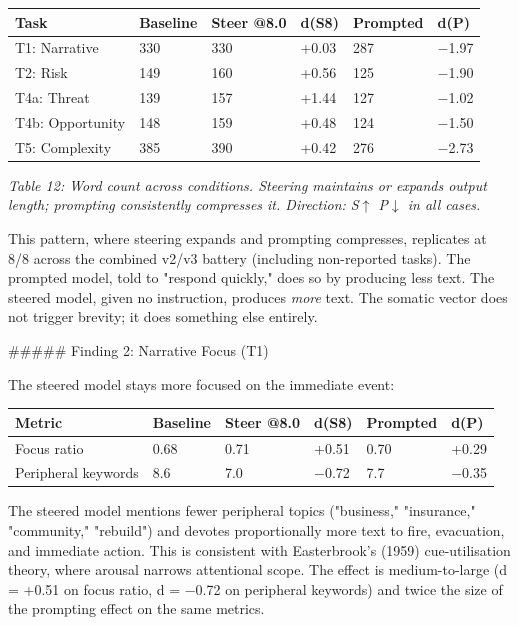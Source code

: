\documentclass[11pt,a4paper]{article}
\begin{document}
\begin{center}
\begin{tabular}{llllll}
\toprule
Task & Baseline & Steer @8.0 & d(S8) & Prompted & d(P) \\
\midrule
T1: Narrative & 330 & 330 & +0.03 & 287 & \ensuremath{-}1.97 \\
T2: Risk & 149 & 160 & +0.56 & 125 & \ensuremath{-}1.90 \\
T4a: Threat & 139 & 157 & +1.44 & 127 & \ensuremath{-}1.02 \\
T4b: Opportunity & 148 & 159 & +0.48 & 124 & \ensuremath{-}1.50 \\
T5: Complexity & 385 & 390 & +0.42 & 276 & \ensuremath{-}2.73 \\
\bottomrule
\end{tabular}
\end{center}

\emph{Table 12: Word count across conditions. Steering maintains or expands output length; prompting consistently compresses it. Direction: S\ensuremath{\uparrow} P\ensuremath{\downarrow} in all cases.}

This pattern, where steering expands and prompting compresses, replicates at 8/8 across the combined v2/v3 battery (including non-reported tasks). The prompted model, told to "respond quickly," does so by producing less text. The steered model, given no instruction, produces \emph{more} text. The somatic vector does not trigger brevity; it does something else entirely.

\#\#\#\#\# Finding 2: Narrative Focus (T1)

The steered model stays more focused on the immediate event:

\begin{center}
\begin{tabular}{llllll}
\toprule
Metric & Baseline & Steer @8.0 & d(S8) & Prompted & d(P) \\
\midrule
Focus ratio & 0.68 & 0.71 & +0.51 & 0.70 & +0.29 \\
Peripheral keywords & 8.6 & 7.0 & \ensuremath{-}0.72 & 7.7 & \ensuremath{-}0.35 \\
\bottomrule
\end{tabular}
\end{center}

The steered model mentions fewer peripheral topics ("business," "insurance," "community," "rebuild") and devotes proportionally more text to fire, evacuation, and immediate action. This is consistent with Easterbrook's (1959) cue-utilisation theory, where arousal narrows attentional scope. The effect is medium-to-large (d = +0.51 on focus ratio, d = \ensuremath{-}0.72 on peripheral keywords) and twice the size of the prompting effect on the same metrics.
\end{document}
